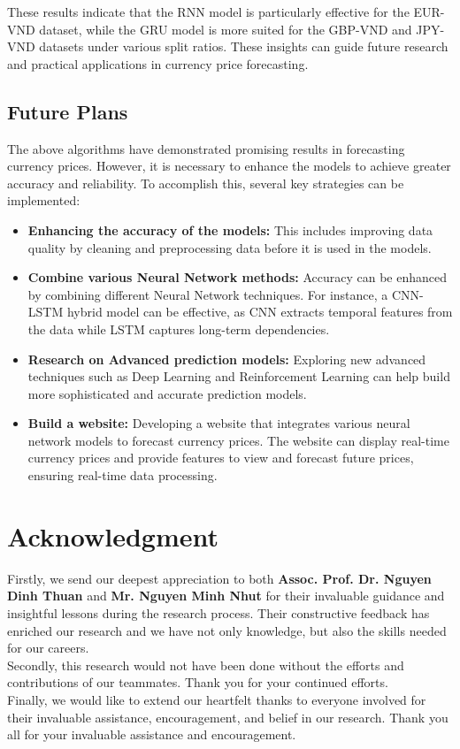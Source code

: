 \documentclass{ieeeojies}
\begin{document}
These results indicate that the RNN model is particularly effective for the EUR-VND dataset, while the GRU model is more suited for the GBP-VND and JPY-VND datasets under various split ratios. These insights can guide future research and practical applications in currency price forecasting.
 
\subsection{Future Plans}
The above algorithms have demonstrated promising results in forecasting currency prices. However, it is necessary to enhance the models to achieve greater accuracy and reliability. To accomplish this, several key strategies can be implemented:
\begin{itemize}
    \item \textbf{Enhancing the accuracy of the models:} This includes improving data quality by cleaning and preprocessing data before it is used in the models.
    \item \textbf{Combine various Neural Network methods:} Accuracy can be enhanced by combining different Neural Network techniques. For instance, a CNN-LSTM hybrid model can be effective, as CNN extracts temporal features from the data while LSTM captures long-term dependencies.
    \item \textbf{Research on Advanced prediction models:} Exploring new advanced techniques such as Deep Learning and Reinforcement Learning can help build more sophisticated and accurate prediction models.
    \item \textbf{Build a website:} Developing a website that integrates various neural network models to forecast currency prices. The website can display real-time currency prices and provide features to view and forecast future prices, ensuring real-time data processing.
\end{itemize}

\section*{Acknowledgment}
Firstly, we send our deepest appreciation to both \textbf{Assoc. Prof. Dr. Nguyen Dinh Thuan} and \textbf{Mr. Nguyen Minh Nhut} for their invaluable guidance and insightful lessons during the research process. Their constructive feedback has enriched our research and we have not only knowledge, but also the skills needed for our careers. 
\\Secondly, this research would not have been done without the efforts and contributions of our teammates. Thank you for your continued efforts. 
\\Finally, we would like to extend our heartfelt thanks to everyone involved for their invaluable assistance, encouragement, and belief in our research. Thank you all for your invaluable assistance and encouragement.

\EOD
\printbibliography
\end{document}
